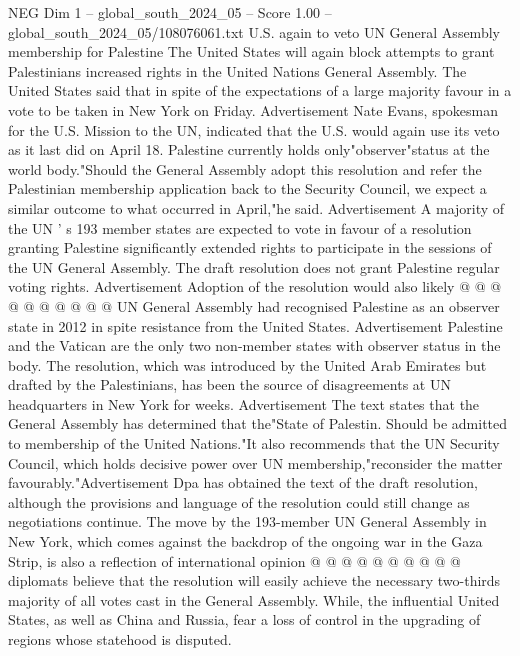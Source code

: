 \begin{textsample}{NEG Dim 1 – global\_south\_2024\_05 – Score 1.00 – global\_south\_2024\_05/108076061.txt}  \label{ex:f1_neg_373}
U.S. again to veto UN General Assembly membership for Palestine The United States will again block attempts to grant Palestinians increased rights in the United Nations General Assembly.
The United States said that in spite of the expectations of a large majority favour in a vote to be taken in New York on Friday.
Advertisement Nate Evans, spokesman for the U.S.
Mission to the UN, indicated that the U.S. would again use its veto as it last did on April 18.
Palestine currently holds only"observer"status at the world body."Should the General Assembly adopt this resolution and refer the Palestinian membership application back to the Security Council, we expect a similar outcome to what occurred in April,"he said.
Advertisement A majority of the UN ' s 193 member states are expected to vote in favour of a resolution granting Palestine significantly extended rights to participate in the sessions of the UN General Assembly.
The draft resolution does not grant Palestine regular voting rights.
Advertisement Adoption of the resolution would also likely @ @ @ @ @ @ @ @ @ @ UN General Assembly had recognised Palestine as an observer state in 2012 in spite resistance from the United States.
Advertisement Palestine and the Vatican are the only two non-member states with observer status in the body.
The resolution, which was introduced by the United Arab Emirates but drafted by the Palestinians, has been the source of disagreements at UN headquarters in New York for weeks.
Advertisement The text states that the General Assembly has determined that the"State of Palestin.
Should be admitted to membership of the United Nations."It also recommends that the UN Security Council, which holds decisive power over UN membership,"reconsider the matter favourably."Advertisement Dpa has obtained the text of the draft resolution, although the provisions and language of the resolution could still change as negotiations continue.
The move by the 193-member UN General Assembly in New York, which comes against the backdrop of the ongoing war in the Gaza Strip, is also a reflection of international opinion @ @ @ @ @ @ @ @ @ @ diplomats believe that the resolution will easily achieve the necessary two-thirds majority of all votes cast in the General Assembly.
While, the influential United States, as well as China and Russia, fear a loss of control in the upgrading of regions whose statehood is disputed.

\end{textsample}
